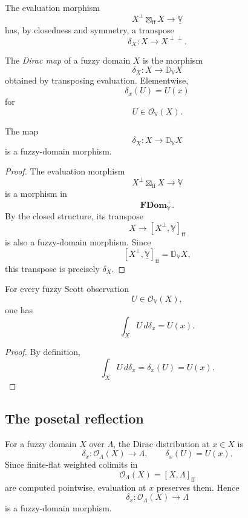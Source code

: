 The evaluation morphism
\[
    X^{\perp}\boxtimes_{\mathrm{ff}}X
    \longrightarrow
    \underline{\mathbb V}
\]
has, by closedness and symmetry, a transpose
\[
    \delta_X:
    X\to X^{\perp\perp}.
\]

\begin{definition}
\label{def:fuzzy-dirac-distribution}
The \emph{Dirac map} of a fuzzy domain \(X\) is the morphism
\[
    \delta_X:
    X\to\mathbb D_{\mathbb V}X
\]
obtained by transposing evaluation.  Elementwise,
\[
    \delta_x(U)=U(x)
\]
for
\[
    U\in\mathcal O_{\mathbb V}(X).
\]
\end{definition}

\begin{proposition}
\label{prop:dirac-distributions-well-defined}
The map
\[
    \delta_X:X\to\mathbb D_{\mathbb V}X
\]
is a fuzzy-domain morphism.
\end{proposition}

\begin{proof}
The evaluation morphism
\[
    X^{\perp}\boxtimes_{\mathrm{ff}}X
    \to
    \underline{\mathbb V}
\]
is a morphism in
\[
    \mathbf{FDom}_{\mathbb V}^{+}.
\]
By the closed structure, its transpose
\[
    X\to[X^{\perp},\underline{\mathbb V}]_{\mathrm{ff}}
\]
is also a fuzzy-domain morphism.  Since
\[
    [X^{\perp},\underline{\mathbb V}]_{\mathrm{ff}}
    =
    \mathbb D_{\mathbb V}X,
\]
this transpose is precisely \(\delta_X\).
\end{proof}

\begin{proposition}
\label{prop:dirac-integration-fuzzy-domain}
For every fuzzy Scott observation
\[
    U\in\mathcal O_{\mathbb V}(X),
\]
one has
\[
    \int_X U\,d\delta_x
    =
    U(x).
\]
\end{proposition}

\begin{proof}
By definition,
\[
    \int_X U\,d\delta_x
    =
    \delta_x(U)
    =
    U(x).
\]
\end{proof}

\subsection{The posetal reflection}
\label{subsec:dirac-posetal}

For a fuzzy domain \(X\) over \(\Lambda\), the Dirac distribution at
\(x\in X\) is
\[
    \delta_x:\mathcal O_{\Lambda}(X)\to\Lambda,
    \qquad
    \delta_x(U)=U(x).
\]
Since finite-flat weighted colimits in
\[
    \mathcal O_{\Lambda}(X)
    =
    [X,\Lambda]_{\mathrm{ff}}
\]
are computed pointwise, evaluation at \(x\) preserves them.  Hence
\[
    \delta_x:\mathcal O_{\Lambda}(X)\to\Lambda
\]
is a fuzzy-domain morphism.

